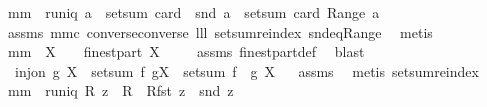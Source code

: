 \begin{isabellebody}
%
\isadelimproof
\isanewline
%
\endisadelimproof
\isanewline
{}\isamarkupfalse%
\ mm{}{}{\isacharcolon}\ \ {\isachardoublequoteopen}runiq\ {\isacharparenleft}a{\isacharcircum}{\isacharminus}{}{\isacharparenright}{\isachardoublequoteclose}\ \ {\isachardoublequoteopen}setsum\ {\isacharparenleft}card\ {\isasymcirc}\ snd{\isacharparenright}\ a\ {\isacharequal}\ setsum\ card\ {\isacharparenleft}Range\ a{\isacharparenright}{\isachardoublequoteclose}\ \isanewline
%
\isadelimproof
%
\endisadelimproof
%
\isatagproof
{}\isamarkupfalse%
\ assms\ mm{}{}c\ converse{\isacharunderscore}converse\ lll{}{}\ setsum{\isachardot}reindex\ snd{\isacharunderscore}eq{\isacharunderscore}Range\ \isamarkupfalse%
\ metis%
\endisatagproof
{\isafoldproof}%
%
\isadelimproof
\isanewline
%
\endisadelimproof
\isanewline
{}\isamarkupfalse%
\ mm{}{}{\isacharcolon}\ \ {\isachardoublequoteopen}X\ {\isasymnoteq}\ {\isacharbraceleft}{\isacharbraceright}{\isachardoublequoteclose}\ \ {\isachardoublequoteopen}finestpart\ X\ {\isasymnoteq}\ {\isacharbraceleft}{\isacharbraceright}{\isachardoublequoteclose}%
\isadelimproof
\ %
\endisadelimproof
%
\isatagproof
{}\isamarkupfalse%
\ assms\ finestpart{\isacharunderscore}def\ \isamarkupfalse%
\ blast%
\endisatagproof
{\isafoldproof}%
%
\isadelimproof
%
\endisadelimproof
\isanewline
\isanewline
{}\isamarkupfalse%
\ \ {\isachardoublequoteopen}inj{\isacharunderscore}on\ g\ X{\isachardoublequoteclose}\ \ {\isachardoublequoteopen}setsum\ f\ {\isacharparenleft}g{\isacharbackquote}X{\isacharparenright}\ {\isacharequal}\ setsum\ {\isacharparenleft}f\ {\isasymcirc}\ g{\isacharparenright}\ X{\isachardoublequoteclose}%
\isadelimproof
\ %
\endisadelimproof
%
\isatagproof
{}\isamarkupfalse%
\ assms\ \isamarkupfalse%
\ {\isacharparenleft}metis\ setsum{\isachardot}reindex{\isacharparenright}%
\endisatagproof
{\isafoldproof}%
%
\isadelimproof
%
\endisadelimproof
\isanewline
\isanewline
{}\isamarkupfalse%
\ mm{}{}{\isacharcolon}\ \ {\isachardoublequoteopen}runiq\ R{\isachardoublequoteclose}\ {\isachardoublequoteopen}z\ {\isasymin}\ R{\isachardoublequoteclose}\ \ {\isachardoublequoteopen}R{\isacharcomma}{\isacharcomma}{\isacharparenleft}fst\ z{\isacharparenright}\ {\isacharequal}\ snd\ z{\isachardoublequoteclose}\ \isanewline

\end{isabellebody}

